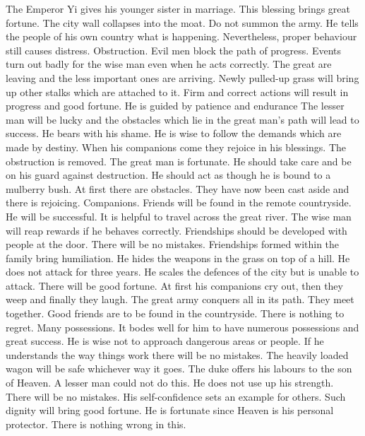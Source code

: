 	{The Emperor Yi gives his younger sister in marriage. This blessing brings great fortune.}
	{The city wall collapses into the moat. Do not summon the army. He tells the people
		of his own country what is happening. Nevertheless, proper behaviour still causes distress.}
\or {}
	{Obstruction. Evil men block the path of progress. Events turn out badly for the wise man even
		when he acts correctly. The great are leaving and the less important ones are arriving.}
	{Newly pulled-up grass will bring up other stalks which are attached to it. Firm and correct
		actions will result in progress and good fortune.}
	{He is guided by patience and endurance The lesser man will be lucky and the obstacles
		which lie in the great man's path will lead to success.}
	{He bears with his shame.}
	{He is wise to follow the demands which are made by destiny. When his companions come
		they rejoice in his blessings.}
	{The obstruction is removed. The great man is fortunate. He should take care and be on
		his guard against destruction. He should act as though he is bound to a mulberry bush.}
	{At first there are obstacles. They have now been cast aside and there is rejoicing.}
\or {}
	{Companions. Friends will be found in the remote countryside. He will be successful. It is helpful to
		travel across the great river. The wise man will reap rewards if he behaves correctly.}
	{Friendships should be developed with people at the door. There will be no mistakes.}
	{Friendships formed within the family bring humiliation.}
	{He hides the weapons in the grass on top of a hill. He does not attack for three years.}
	{He scales the defences of the city but is unable to attack. There will be good fortune.}
	{At first his companions cry out, then they weep and finally they laugh. The great army
		conquers all in its path. They meet together.}
	{Good friends are to be found in the countryside. There is nothing to regret.}
\or {}
	{Many possessions. It bodes well for him to have numerous possessions and great success.}
	{He is wise not to approach dangerous areas or people. If he understands the way things
		work there will be no mistakes.}
	{The heavily loaded wagon will be safe whichever way it goes.}
	{The duke offers his labours to the son of Heaven. A lesser man could not do this.}
	{He does not use up his strength. There will be no mistakes.}
	{His self-confidence sets an example for others. Such dignity will bring good fortune.}
	{He is fortunate since Heaven is his personal protector. There is nothing wrong in this.}
